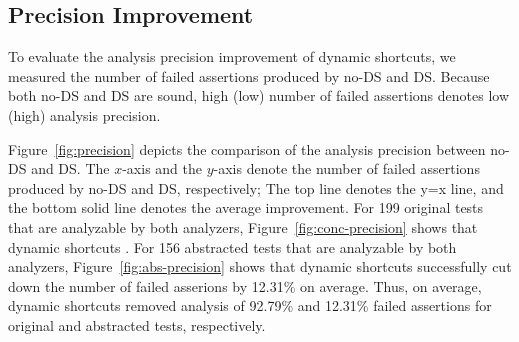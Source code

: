 \subsection{Precision Improvement}

To evaluate the analysis precision improvement of dynamic shortcuts,
we measured the number of failed assertions produced by no-DS and DS.
Because both no-DS and DS are sound,
high (low) number of failed assertions denotes low (high) analysis precision.

Figure~\ref{fig:precision} depicts the comparison of the analysis
precision between no-DS and DS.  The $x$-axis and the $y$-axis denote
the number of failed assertions produced by no-DS and DS, respectively;
 The top line
denotes the y=x line, and the bottom solid line denotes the average improvement.
For 199 original tests that are analyzable by both analyzers,
Figure~\ref{fig:conc-precision} shows that dynamic shortcuts
.
For 156 abstracted tests that are analyzable by both analyzers,
Figure~\ref{fig:abs-precision} shows that dynamic shortcuts successfully cut down
the number of failed asserions by 12.31\% on average.
Thus, on average, dynamic shortcuts removed analysis of 92.79\% and 12.31\% failed assertions
for original and abstracted tests, respectively.
